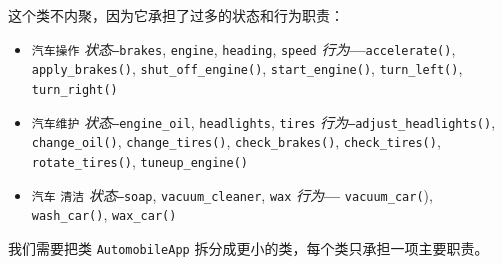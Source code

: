 这个类不内聚，因为它承担了过多的状态和行为职责：

\begin{itemize}
\item \texttt{汽车操作} \emph{状态}\texttt{—brakes}, \texttt{engine}, \texttt{heading}, \texttt{speed} \emph{行为}\textbf{—}\texttt{accelerate(\allowbreak{})\allowbreak{}}, \texttt{apply\_\allowbreak{}brakes(\allowbreak{})\allowbreak{}}, \texttt{shut\_\allowbreak{}off\_\allowbreak{}engine(\allowbreak{})\allowbreak{}}, \texttt{start\_\allowbreak{}engine(\allowbreak{})\allowbreak{}}, \texttt{turn\_\allowbreak{}left(\allowbreak{})\allowbreak{}}, \texttt{turn\_\allowbreak{}right(\allowbreak{})\allowbreak{}}
\item \texttt{汽车维护} \emph{状态}\texttt{—engine\_\allowbreak{}oil}, \texttt{headlights}, \texttt{tires} \emph{行为}\texttt{—adjust\_\allowbreak{}headlights(\allowbreak{})\allowbreak{}}, \texttt{change\_\allowbreak{}oil(\allowbreak{})\allowbreak{}}, \texttt{change\_\allowbreak{}tires(\allowbreak{})\allowbreak{}}, \texttt{check\_\allowbreak{}brakes(\allowbreak{})\allowbreak{}}, \texttt{check\_\allowbreak{}tires(\allowbreak{})\allowbreak{}}, \texttt{rotate\_\allowbreak{}tires(\allowbreak{})\allowbreak{}}, \texttt{tuneup\_\allowbreak{}engine(\allowbreak{})\allowbreak{}}
\item \texttt{汽车} \texttt{清洁} \emph{状态}\texttt{—soap}, \texttt{vacuum\_\allowbreak{}cleaner}, \texttt{wax} \emph{行为}\textbf{—} \texttt{vacuum\_\allowbreak{}car(\allowbreak{}}), \texttt{wash\_\allowbreak{}car(\allowbreak{})\allowbreak{}}, \texttt{wax\_\allowbreak{}car(\allowbreak{})\allowbreak{}}
\end{itemize}

我们需要把类 \texttt{Automobile\allowbreak{}App} 拆分成更小的类，每个类只承担一项主要职责。


